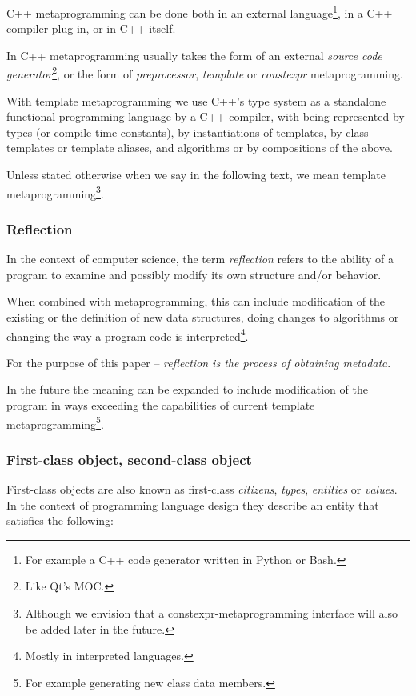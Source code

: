 C++ metaprogramming can be done both in an external language\footnote{For example a
C++ code generator written in Python or Bash.}, in a C++ compiler plug-in,
or in C++ itself. 

In C++ metaprogramming usually takes the form of an external
{\em source code generator}\footnote{Like Qt's MOC.}, or the form
of {\em preprocessor}, {\em template} or {\em constexpr} metaprogramming.

With template metaprogramming we use C++'s type system
as a standalone functional programming language  by a C++
compiler, with  being
represented by types (or compile-time constants),
 by instantiations of templates,
 by class templates or template aliases, and
algorithms or  by compositions of the above.

Unless stated otherwise when we say  in the following text,
we mean template metaprogramming\footnote{Although we envision that
a constexpr-metaprogramming interface will also be added later in the future.}.

\subsubsection{Reflection}

In the context of computer science,
the term {\em reflection} refers to the ability of a program to examine
and possibly modify its own structure and/or behavior.

When combined with metaprogramming, this can include modification of the existing
or the definition of new data structures, doing changes to algorithms or changing the way
a program code is interpreted\footnote{Mostly in interpreted languages.}.

For the purpose of this paper -- {\em reflection is the process of obtaining
metadata}.

In the future the meaning can be expanded to include modification of the program
in ways exceeding the capabilities of current template
metaprogramming\footnote{For example generating new class data members.}.

\subsubsection{First-class object, second-class object}
\label{term-first-class}

First-class objects are also known as first-class {\em citizens}, {\em types},
{\em entities} or {\em values}.
In the context of programming language design they describe an entity that satisfies
the following:

